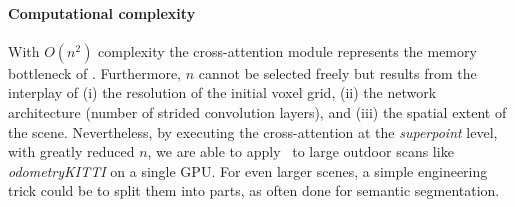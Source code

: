 \paragraph{Computational complexity}
With $O(n^2)$ complexity the cross-attention module represents the memory bottleneck of \acro. Furthermore, $n$ cannot be selected freely but results from the interplay of (i) the resolution of the initial voxel grid, (ii) the network architecture (number of strided convolution layers), and (iii) the spatial extent of the scene. Nevertheless, by executing the cross-attention at the \emph{superpoint} level, with greatly reduced $n$, we are able to apply \acro\ to large outdoor scans like \emph{odometryKITTI} on a single GPU. For even larger scenes, a simple engineering trick could be to split them into parts, as often done for semantic segmentation.
